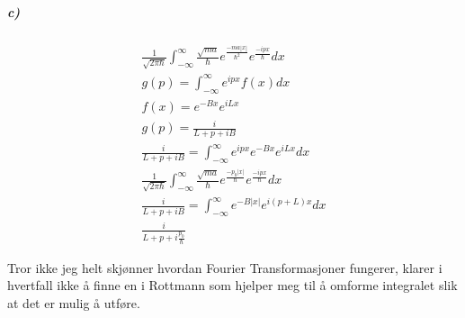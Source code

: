 \documentclass[11pt, A4paper,norsk]{article}
\begin{document}
			\subparagraph{c)}
				\begin{gather}
\frac{1}{\sqrt{2\pi\hbar}} \int_{-\infty}^{\infty} \frac{\sqrt{ma}}{\hbar}e^{\frac{-ma|x|}{\hbar^{2}}}e^{\frac{-ipx}{\hbar}}dx \\
g(p) = \int_{-\infty}^{\infty} e^{ipx}f(x)dx \\
f(x) = e^{-Bx}e^{iLx} \\
g(p) = \frac{i}{L + p + iB} \\
\frac{i}{L + p + iB} = \int_{-\infty}^{\infty} e^{ipx} e^{-Bx}e^{iLx} dx \\
\frac{1}{\sqrt{2\pi\hbar}} \int_{-\infty}^{\infty} \frac{\sqrt{ma}}{\hbar}e^{\frac{-p_{0}|x|}{\hbar}}e^{\frac{-ipx}{\hbar}}dx \\
\frac{i}{L + p + iB} = \int_{-\infty}^{\infty} e^{-B|x|} e^{i(p + L)x} dx \\
\frac{i}{L + p + i\frac{p_{0}}{\hbar}}
				\end{gather}
				\begin{flushleft}
Tror ikke jeg helt skjønner hvordan Fourier Transformasjoner fungerer, klarer i hvertfall ikke å finne en i Rottmann som hjelper meg til å omforme integralet slik at det er mulig å utføre.
				\end{flushleft}
\end{document}
